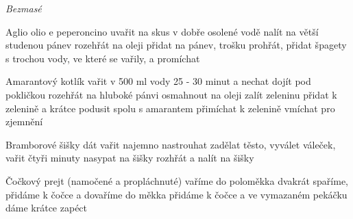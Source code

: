 \documentclass[12pt,a4paper]{article}
\begin{document}
\vspace*{\fill}
\hfill {\Huge\it Bezmasé}\hfill
\vspace*{\fill}
\newpage

\begin{recipe}{Aglio olio e peperoncino}
   uvařit na skus v dobře osolené vodě
   nalít na větší studenou pánev
   rozehřát na oleji
   přidat na pánev, trošku prohřát, přidat špagety s trochou vody, ve které se vařily, a promíchat
\end{recipe}
\newpage

\begin{recipe}{Amarantový kotlík}
   vařit v 500 ml vody 25 - 30 minut a nechat dojít pod pokličkou
   rozehřát na hluboké pánvi
   osmahnout na oleji
   zalít zeleninu
   přidat k zelenině a krátce podusit
   spolu s amarantem přimíchat k zelenině
   vmíchat pro zjemnění
\end{recipe}
\newpage

\begin{recipe}{Bramborové šišky}
   dát vařit
   najemno nastrouhat
   zadělat těsto, vyválet váleček, vařit čtyři minuty
   nasypat na šišky
   rozhřát a nalít na šišky
\end{recipe}
\newpage

\begin{recipe}{Čočkový prejt}
   (namočené a propláchnuté)
   vaříme do poloměkka
   dvakrát spaříme, přidáme k čočce a dovaříme do měkka
   přidáme k čočce a ve vymazaném pekáčku dáme krátce zapéct
\end{recipe}
\newpage
\end{document}
